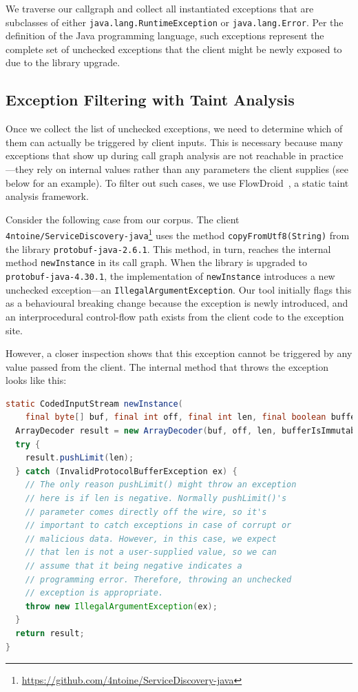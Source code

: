 We traverse our callgraph and collect all instantiated exceptions that are subclasses of either \texttt{java.lang.RuntimeException} or \texttt{java.lang.Error}. Per the definition of the Java programming language, such exceptions represent the complete set of unchecked exceptions that the client might be newly exposed to due to the library upgrade.

\subsection{Exception Filtering with Taint Analysis}

Once we collect the list of unchecked exceptions, we need to determine which of them can actually be triggered by client inputs. This is necessary because many exceptions that show up during call graph analysis are not reachable in practice—they rely on internal values rather than any parameters the client supplies (see below for an example). To filter out such cases, we use FlowDroid~\cite{Arzt14:_flowdroid}, a static taint analysis framework.

Consider the following case from our corpus. The client \texttt{4ntoine/ServiceDiscovery-java}\footnote{\url{https://github.com/4ntoine/ServiceDiscovery-java}} uses the method \texttt{copyFromUtf8(String)} from the library \texttt{protobuf-java-2.6.1}. This method, in turn, reaches the internal method \texttt{newInstance} in its call graph. When the library is upgraded to \texttt{protobuf-java-4.30.1}, the implementation of \texttt{newInstance} introduces a new unchecked exception—an \texttt{IllegalArgumentException}. Our tool initially flags this as a behavioural breaking change because the exception is newly introduced, and an interprocedural control-flow path exists from the client code to the exception site.

However, a closer inspection shows that this exception cannot be triggered by any value passed from the client. The internal method that throws the exception looks like this:

\begin{lstlisting}[language=Java,breaklines=true,basicstyle=\scriptsize\ttfamily]
static CodedInputStream newInstance(
    final byte[] buf, final int off, final int len, final boolean bufferIsImmutable) {
  ArrayDecoder result = new ArrayDecoder(buf, off, len, bufferIsImmutable);
  try {
    result.pushLimit(len);
  } catch (InvalidProtocolBufferException ex) {
    // The only reason pushLimit() might throw an exception
    // here is if len is negative. Normally pushLimit()'s
    // parameter comes directly off the wire, so it's 
    // important to catch exceptions in case of corrupt or
    // malicious data. However, in this case, we expect 
    // that len is not a user-supplied value, so we can 
    // assume that it being negative indicates a 
    // programming error. Therefore, throwing an unchecked 
    // exception is appropriate.
    throw new IllegalArgumentException(ex);
  }
  return result;
}
\end{lstlisting}


